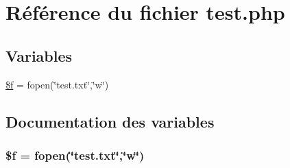 \hypertarget{veille__sanitaire_2cron_2test_8php}{
\section{R\'{e}f\'{e}rence du fichier test.php}
\label{veille__sanitaire_2cron_2test_8php}
}
\subsection*{Variables}
\begin{CompactItemize}
\item 
\hyperlink{veille__sanitaire_2cron_2test_8php_a0}{\$f} = fopen(\char`\"{}test.txt\char`\"{},\char`\"{}w\char`\"{})
\end{CompactItemize}


\subsection{Documentation des variables}
\hypertarget{veille__sanitaire_2cron_2test_8php_a0}{
\subsubsection[\$f]{\setlength{\rightskip}{0pt plus 5cm}\$f = fopen(\char`\"{}test.txt\char`\"{},\char`\"{}w\char`\"{})}}
\label{veille__sanitaire_2cron_2test_8php_a0}


